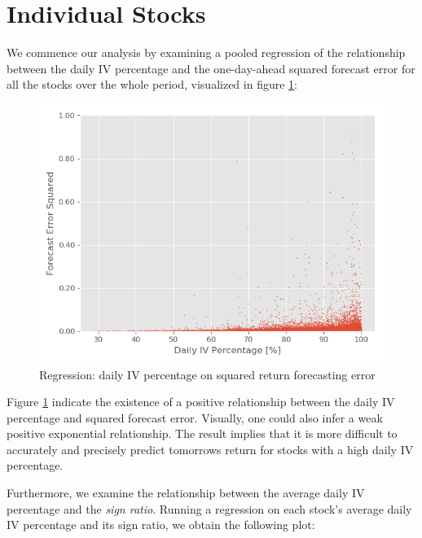 \section{Individual Stocks}

We commence our analysis by examining a pooled regression of the relationship between the daily IV percentage and the one-day-ahead squared forecast error for all the stocks over the whole period, visualized in figure \ref{Scatter regression}: 

\begin{figure}[h]
    \centering
    \includegraphics[scale = 0.5]{Plot/ScatterRegression.png}
    \caption{Regression: daily IV percentage on squared return forecasting error}
    \label{Scatter regression}
\end{figure}

Figure \ref{Scatter regression} indicate the existence of a positive relationship between the daily IV percentage and squared forecast error. Visually, one could also infer a weak positive exponential relationship. The result implies that it is more difficult to accurately and precisely predict tomorrows return for stocks with a high daily IV percentage.

Furthermore, we examine the relationship between the average daily IV percentage and the \textit{sign ratio}. Running a regression on each stock's average daily IV percentage and its sign ratio, we obtain the following plot: 

